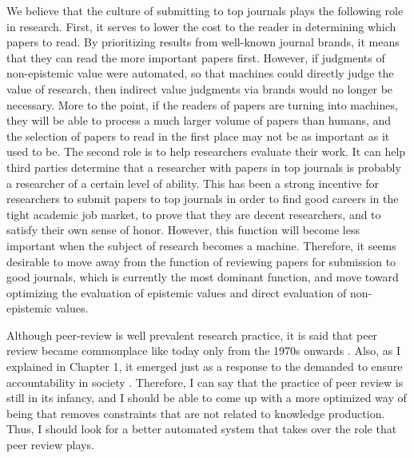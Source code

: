 \documentclass{article}
\begin{document}
We believe that the culture of submitting to top journals plays the following role in research. First, it serves to lower the cost to the reader in determining which papers to read. By prioritizing results from well-known journal brands, it means that they can read the more important papers first. However, if judgments of non-epistemic value were automated, so that machines could directly judge the value of research, then indirect value judgments via brands would no longer be necessary. More to the point, if the readers of papers are turning into machines, they will be able to process a much larger volume of papers than humans, and the selection of papers to read in the first place may not be as important as it used to be. The second role is to help researchers evaluate their work. It can help third parties determine that a researcher with papers in top journals is probably a researcher of a certain level of ability. This has been a strong incentive for researchers to submit papers to top journals in order to find good careers in the tight academic job market, to prove that they are decent researchers, and to satisfy their own sense of honor. However, this function will become less important when the subject of research becomes a machine. Therefore, it seems desirable to move away from the function of reviewing papers for submission to good journals, which is currently the most dominant function, and move toward optimizing the evaluation of epistemic values and direct evaluation of non-epistemic values.

Although peer-review is well prevalent research practice, it is said that peer review became commonplace like today only from the 1970s onwards \cite{baldwin2018scientific}. Also, as I explained in Chapter 1, it emerged just as a response to the demanded to ensure accountability in society \cite{baldwin2018scientific}. Therefore, I can say that the practice of peer review is still in its infancy, and I should be able to come up with a more optimized way of being that removes constraints that are not related to knowledge production. Thus, I should look for a better automated system that takes over the role that peer review plays.


\end{document}
